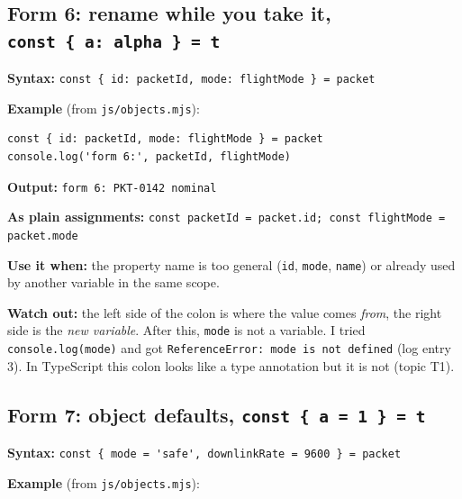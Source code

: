 \hypertarget{form-6-rename-while-you-take-it-const--a-alpha---t}{%
\subsection{\texorpdfstring{Form 6: rename while you take it, \texttt{const\ \{\ a:\ alpha\ \}\ =\ t}}{Form 6: rename while you take it, const \{ a: alpha \} = t}}\label{form-6-rename-while-you-take-it-const--a-alpha---t}}

\textbf{Syntax:} \passthrough{\lstinline!const \{ id: packetId, mode: flightMode \} = packet!}

\textbf{Example} (from \passthrough{\lstinline!js/objects.mjs!}):

\begin{lstlisting}
const { id: packetId, mode: flightMode } = packet
console.log('form 6:', packetId, flightMode)
\end{lstlisting}

\textbf{Output:} \passthrough{\lstinline!form 6: PKT-0142 nominal!}

\textbf{As plain assignments:} \passthrough{\lstinline!const packetId = packet.id; const flightMode = packet.mode!}

\textbf{Use it when:} the property name is too general (\passthrough{\lstinline!id!}, \passthrough{\lstinline!mode!}, \passthrough{\lstinline!name!}) or already used by another variable in the same scope.

\textbf{Watch out:} the left side of the colon is where the value comes \emph{from}, the right side is the \emph{new variable}. After this, \passthrough{\lstinline!mode!} is not a variable. I tried \passthrough{\lstinline!console.log(mode)!} and got \passthrough{\lstinline!ReferenceError: mode is not defined!} (log entry 3). In TypeScript this colon looks like a type annotation but it is not (topic T1).

\hypertarget{form-7-object-defaults-const--a--1---t}{%
\subsection{\texorpdfstring{Form 7: object defaults, \texttt{const\ \{\ a\ =\ 1\ \}\ =\ t}}{Form 7: object defaults, const \{ a = 1 \} = t}}\label{form-7-object-defaults-const--a--1---t}}

\textbf{Syntax:} \passthrough{\lstinline!const \{ mode = 'safe', downlinkRate = 9600 \} = packet!}

\textbf{Example} (from \passthrough{\lstinline!js/objects.mjs!}):

